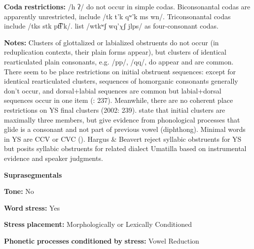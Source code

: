 \begin{styleBody}
\textbf{Coda} \textbf{restrictions:} /h ʔ/ do not occur in simple codas. Biconsonantal codas are apparently unrestricted, include /tk t’k qʷ'k ms wn/. Triconsonantal codas include /tks stk pt͡ɬ’k/. \citet{HargusBeavert2006} list /wtkʷʃ wq’$\chi ʃ$ jlps/ as four-consonant codas.
\end{styleBody}

\begin{styleBody}
\textbf{Notes:} Clusters of glottalized or labialized obstruents do not occur (in reduplication contexts, their plain forms appear), but clusters of identical rearticulated plain consonants, e.g. /pp/, /qq/, do appear and are common. There seem to be place restrictions on initial obstruent sequences: except for identical rearticulated clusters, sequences of homorganic consonants generally don’t occur, and dorsal+labial sequences are common but labial+dorsal sequences occur in one item (\citealt{HargusBeavert2002}: 237). Meanwhile, there are no coherent place restrictions on YS final clusters (2002: 239). \citet{RigsbyRude1996} state that initial clusters are maximally three members, but \citet{HargusBeavert2006} give evidence from phonological processes that glide is a consonant and not part of previous vowel (diphthong). Minimal words in YS are CCV or CVC (\citealt{HargusBeavert2006}). Hargus \& Beavert reject syllabic obstruents for YS but \citet{Minthorn2005} posits syllabic obstruents for related dialect Umatilla based on instrumental evidence and speaker judgments.
\end{styleBody}

\begin{styleBody}
\textbf{Suprasegmentals}
\end{styleBody}

\begin{styleBody}
\textbf{Tone:} No
\end{styleBody}

\begin{styleBody}
\textbf{Word} \textbf{stress:} Yes
\end{styleBody}

\begin{styleBody}
\textbf{Stress} \textbf{placement:} Morphologically or Lexically Conditioned
\end{styleBody}

\begin{styleBody}
\textbf{Phonetic} \textbf{processes} \textbf{conditioned} \textbf{by} \textbf{stress:} Vowel Reduction
\end{styleBody}


